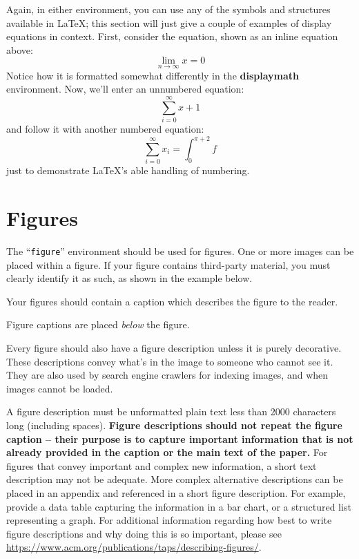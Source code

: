 \documentclass[sigplan,screen]{acmart}
\begin{document}
Again, in either environment, you can use any of the symbols and
structures available in \LaTeX\@; this section will just give a couple
of examples of display equations in context.  First, consider the
equation, shown as an inline equation above:
\begin{equation}
  \lim_{n\rightarrow \infty}x=0
\end{equation}
Notice how it is formatted somewhat differently in
the \textbf{displaymath}
environment.  Now, we'll enter an unnumbered equation:
\begin{displaymath}
  \sum_{i=0}^{\infty} x + 1
\end{displaymath}
and follow it with another numbered equation:
\begin{equation}
  \sum_{i=0}^{\infty}x_i=\int_{0}^{\pi+2} f
\end{equation}
just to demonstrate \LaTeX's able handling of numbering.

\section{Figures}

The ``\verb|figure|'' environment should be used for figures. One or
more images can be placed within a figure. If your figure contains
third-party material, you must clearly identify it as such, as shown
in the example below.

Your figures should contain a caption which describes the figure to
the reader.

Figure captions are placed {\itshape below} the figure.

Every figure should also have a figure description unless it is purely
decorative. These descriptions convey what’s in the image to someone
who cannot see it. They are also used by search engine crawlers for
indexing images, and when images cannot be loaded.

A figure description must be unformatted plain text less than 2000
characters long (including spaces).  {\bfseries Figure descriptions
  should not repeat the figure caption – their purpose is to capture
  important information that is not already provided in the caption or
  the main text of the paper.} For figures that convey important and
complex new information, a short text description may not be
adequate. More complex alternative descriptions can be placed in an
appendix and referenced in a short figure description. For example,
provide a data table capturing the information in a bar chart, or a
structured list representing a graph.  For additional information
regarding how best to write figure descriptions and why doing this is
so important, please see
\url{https://www.acm.org/publications/taps/describing-figures/}.
\end{document}
